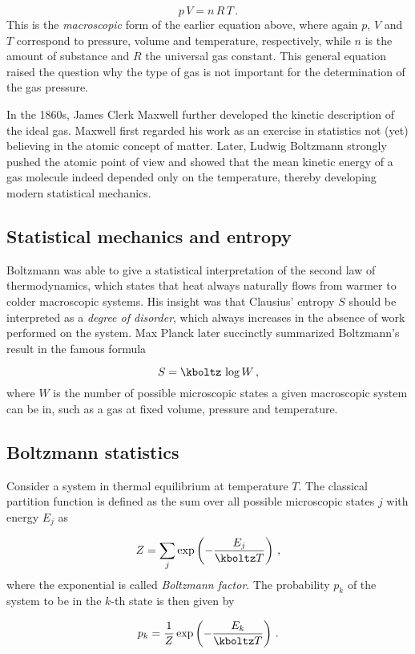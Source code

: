 \begin{equation*}\label{eq:ideal-nr}
  p\, V=n\, R\, T\,.
\end{equation*}
%
This is the \emph{macroscopic} form of the earlier equation above, where again $p$, $V$ and $T$ correspond to pressure, volume and temperature, respectively, while $n$ is the amount of substance and $R$ the universal gas constant. This general equation raised the question why the type of gas is not important for the determination of the gas pressure.

In the 1860s, James Clerk Maxwell further developed the kinetic description of the ideal gas. Maxwell first regarded his work as an exercise in statistics not (yet) believing in the atomic concept of matter. Later, Ludwig Boltzmann strongly pushed the atomic point of view and showed that the mean kinetic energy of a gas molecule indeed depended only on the temperature, thereby developing modern statistical mechanics.


\subsection*{Statistical mechanics and entropy}
 
Boltzmann was able to give a statistical interpretation of the second law of thermodynamics, which states that heat always naturally flows from warmer to colder macroscopic systems. His insight was that Clausius' entropy $S$ should be interpreted as a \emph{degree of disorder}, which always increases in the absence of work performed on the system. Max Planck later succinctly summarized Boltzmann's result in the famous formula

\begin{equation*}\label{eq:ideal-nr}
  S=\kboltz\, \log W\,,
\end{equation*}
%
where $W$ is the number of possible microscopic states a given macroscopic system can be in, such as a gas at fixed volume, pressure and temperature.


\subsection*{Boltzmann statistics}

Consider a system in thermal equilibrium at temperature $T$. The classical partition function is defined as the sum over all possible microscopic states $j$ with energy $E_j$ as

\begin{equation*}\label{eq:ideal-nr}
  Z=\sum_j \exp \left(-\frac{E_j}{\kboltz T}\right)\,,
\end{equation*}
%
where the exponential is called \emph{Boltzmann factor}. The probability $p_k$ of the system to be in the $k$-th state is then given by

\begin{equation*}\label{eq:ideal-nr}
  p_k=\frac{1}{Z} \exp \left(-\frac{E_k}{\kboltz T}\right)\,.
\end{equation*}

